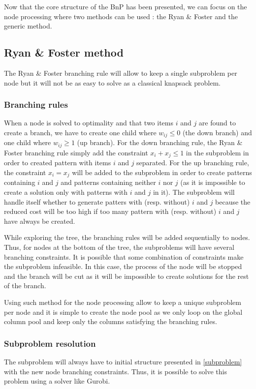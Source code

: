Now that the core structure of the BnP has been presented, we can focus on the node processing where two methods can be used : the Ryan \& Foster and the generic method.

\subsection{Ryan \& Foster method}
\label{ryan-foster}

The Ryan \& Foster branching rule will allow to keep a single subproblem per node but it will not be as easy to solve as a classical knapsack problem. 

\subsubsection{Branching rules}

When a node is solved to optimality and that two items $i$ and $j$ are found to create a branch, we have to create one child where $w_{ij} \leq 0$ (the down branch) and one child where $w_{ij} \geq 1$ (up branch). For the down branching rule, the Ryan \& Foster branching rule simply add the constraint $x_i + x_j \leq 1$ in the subproblem in order to created pattern with items $i$ and $j$ separated. For the up branching rule, the constraint $x_i = x_j$ will be added to the subproblem in order to create patterns containing $i$ and $j$ and patterns containing neither $i$ nor $j$ (as it is impossible to create a solution only with patterns with $i$ and $j$ in it). The subproblem will handle itself whether to generate patters with (resp. without) $i$ and $j$ because the reduced cost will be too high if too many pattern with (resp. without) $i$ and $j$ have always be created.

While exploring the tree, the branching rules will be added sequentially to nodes. Thus, for nodes at the bottom of the tree, the subproblems will have several branching constraints. It is possible that some combination of constraints make the subproblem infeasible. In this case, the process of the node will be stopped and the branch will be cut as it will be impossible to create solutions for the rest of the branch. 

Using such method for the node processing allow to keep a unique subproblem per node and it is simple to create the node pool as we only loop on the global column pool and keep only the columns satisfying the branching rules.

\subsubsection{Subproblem resolution}

The subproblem will always have to initial structure presented in \ref{subproblem} with the new node branching constraints. Thus, it is possible to solve this problem using a solver like Gurobi. 
